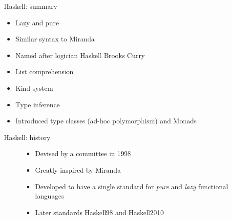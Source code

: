 \documentclass[pdf]{beamer}
\begin{document}
\begin{frame}{Haskell: summary}
  \begin{figure}[H]
    \centering
    \hspace{0.3cm}
  \end{figure}
      \begin{itemize}
      \item Lazy and pure
      \item Similar syntax to Miranda
      \item Named after logician Haskell Brooks Curry
      \item List comprehension
      \item Kind system
      \item Type inference
      \item Introduced type classes (ad-hoc polymorphism) and Monads
      \end{itemize}
\end{frame}

\begin{frame}{Haskell: history}
  \begin{figure}[H]
    \centering
    \begin{itemize}
    \item Devised by a committee in 1998
    \item Greatly inspired by Miranda
    \item Developed to have a single standard for \textit{pure} and \textit{lazy} functional languages
    \item Later standards Haskell98 and Haskell2010
    \end{itemize}
  \end{figure}
\end{frame}
\end{document}
